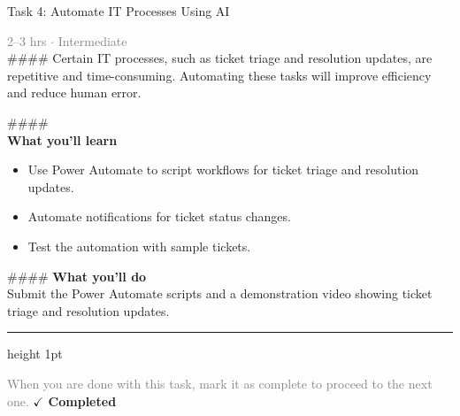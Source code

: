 \documentclass[10pt,a4paper]{article}
\begin{document}
\begin{taskbox}{Task 4: Automate IT Processes Using AI}

    {\small \textcolor{gray}{2--3 hrs $\cdot$ Intermediate}}\\[12pt]

    \#\#\#\#   
Certain IT processes, such as ticket triage and resolution updates, are repetitive and time-consuming. Automating these tasks will improve efficiency and reduce human error.  

\#\#\#\# \\[10pt]
\vspace{8pt}
{\large \textbf{\textcolor{brandLight}{What you'll learn}}}\\[4pt]  
\begin{itemize}
    \item Use Power Automate to script workflows for ticket triage and resolution updates.  
    \item Automate notifications for ticket status changes.  
    \item Test the automation with sample tickets.  
\end{itemize}

\#\#\#\# \vspace{8pt}
{\large \textbf{\textcolor{brandLight}{What you'll do}}}\\[4pt]  
Submit the Power Automate scripts and a demonstration video showing ticket triage and resolution updates.\par

    \vspace{16pt}

    \textcolor{cardBorder}{\hrule height 1pt}\vspace{8pt}

    \small \textcolor{gray}{When you are done with this task, mark it as complete to proceed to the next one.} \hfill \textbf{\textcolor{brandDark}{$\checkmark$ Completed}}

\end{taskbox}
\end{document}
